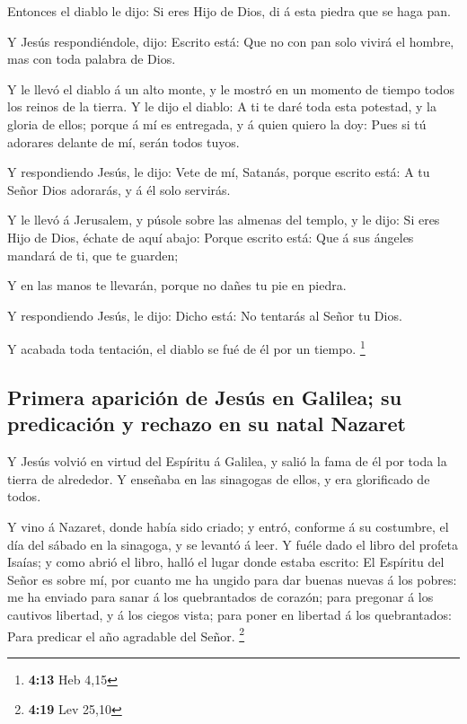 Entonces el diablo le dijo: Si eres Hijo de Dios, di á
esta piedra que se haga pan.

 Y Jesús respondiéndole, dijo: Escrito está: Que no con
pan solo vivirá el hombre, mas con toda palabra de Dios.

 Y le llevó el diablo á un alto monte, y le mostró en un
momento de tiempo todos los reinos de la tierra.  Y le
dijo el diablo: A ti te daré toda esta potestad, y la gloria de ellos;
porque á mí es entregada, y á quien quiero la doy:  Pues
si tú adorares delante de mí, serán todos tuyos.

 Y respondiendo Jesús, le dijo: Vete de mí, Satanás,
porque escrito está: A tu Señor Dios adorarás, y á él solo servirás.

 Y le llevó á Jerusalem, y púsole sobre las almenas del
templo, y le dijo: Si eres Hijo de Dios, échate de aquí abajo:
 Porque escrito está: Que á sus ángeles mandará de ti,
que te guarden;

 Y en las manos te llevarán, porque no dañes tu pie en
piedra.

 Y respondiendo Jesús, le dijo: Dicho está: No tentarás
al Señor tu Dios.

 Y acabada toda tentación, el diablo se fué de él por un
tiempo. \footnote{\textbf{4:13} Heb 4,15}

\hypertarget{primera-apariciuxf3n-de-jesuxfas-en-galilea-su-predicaciuxf3n-y-rechazo-en-su-natal-nazaret}{%
\subsection{Primera aparición de Jesús en Galilea; su predicación y
rechazo en su natal
Nazaret}\label{primera-apariciuxf3n-de-jesuxfas-en-galilea-su-predicaciuxf3n-y-rechazo-en-su-natal-nazaret}}

 Y Jesús volvió en virtud del Espíritu á Galilea, y salió
la fama de él por toda la tierra de alrededor.  Y
enseñaba en las sinagogas de ellos, y era glorificado de todos.

 Y vino á Nazaret, donde había sido criado; y entró,
conforme á su costumbre, el día del sábado en la sinagoga, y se levantó
á leer.  Y fuéle dado el libro del profeta Isaías; y como
abrió el libro, halló el lugar donde estaba escrito:  El
Espíritu del Señor es sobre mí, por cuanto me ha ungido para dar buenas
nuevas á los pobres: me ha enviado para sanar á los quebrantados de
corazón; para pregonar á los cautivos libertad, y á los ciegos vista;
para poner en libertad á los quebrantados:  Para predicar
el año agradable del Señor. \footnote{\textbf{4:19} Lev 25,10}

